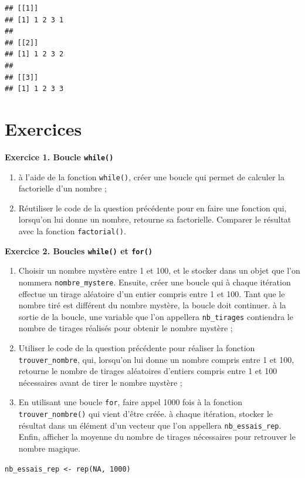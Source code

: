 \documentclass[
  11pt,
]{book}
\makeatletter
\providecommand{\tightlist}{%
  \setlength{\itemsep}{0pt}\setlength{\parskip}{0pt}}
\numberwithin{equation}{section}
\numberwithin{countremarque}{section}
\newcounter{exercices}[section]
\newenvironment{exframe}{%
 \def\at@end@of@exframe{}%
 \ifinner\ifhmode%
  \def\at@end@of@exframe{\end{minipage}}%
  \begin{minipage}{\columnwidth}%
 \fi\fi%
 \def\FrameCommand##1{\hskip\@totalleftmargin \hskip-\fboxsep
 \colorbox{shadecolorex}{##1}\hskip-\fboxsep
     \hskip-\linewidth \hskip-\@totalleftmargin \hskip\columnwidth}%
 \MakeFramed {\advance\hsize-\width
   \@totalleftmargin\z@ \linewidth\hsize
   \@setminipage}}%
 {\par\unskip\endMakeFramed%
 \at@end@of@exframe}
\makeatother
\begin{document}
\begin{lstlisting}
## [[1]]
## [1] 1 2 3 1
## 
## [[2]]
## [1] 1 2 3 2
## 
## [[3]]
## [1] 1 2 3 3
\end{lstlisting}

\hypertarget{boucles_exercices}{%
\section{Exercices}\label{boucles_exercices}}

\begin{exframe}
\textbf{Exercice 1. Boucle \texttt{while()}}

\begin{enumerate}
\def\labelenumi{\arabic{enumi}.}
\tightlist
\item
  à l'aide de la fonction \texttt{while()}, créer une boucle qui permet de calculer la factorielle d'un nombre ;
\item
  Réutiliser le code de la question précédente pour en faire une fonction qui, lorsqu'on lui donne un nombre, retourne sa factorielle. Comparer le résultat avec la fonction \texttt{factorial()}.
\end{enumerate}
\end{exframe}

\begin{exframe}
\textbf{Exercice 2. Boucles \texttt{while()} et \texttt{for()}}

\begin{enumerate}
\def\labelenumi{\arabic{enumi}.}
\tightlist
\item
  Choisir un nombre mystère entre 1 et 100, et le stocker dans un objet que l'on nommera \texttt{nombre\_mystere}. Ensuite, créer une boucle qui à chaque itération effectue un tirage aléatoire d'un entier compris entre 1 et 100. Tant que le nombre tiré est différent du nombre mystère, la boucle doit continuer. à la sortie de la boucle, une variable que l'on appellera \texttt{nb\_tirages} contiendra le nombre de tirages réalisés pour obtenir le nombre mystère ;
\item
  Utiliser le code de la question précédente pour réaliser la fonction \texttt{trouver\_nombre}, qui, lorsqu'on lui donne un nombre compris entre 1 et 100, retourne le nombre de tirages aléatoires d'entiers compris entre 1 et 100 nécessaires avant de tirer le nombre mystère ;
\item
  En utilisant une boucle \texttt{for}, faire appel 1000 fois à la fonction \texttt{trouver\_nombre()} qui vient d'être créée. à chaque itération, stocker le résultat dans un élément d'un vecteur que l'on appellera \texttt{nb\_essais\_rep}. Enfin, afficher la moyenne du nombre de tirages nécessaires pour retrouver le nombre magique.
\end{enumerate}

\texttt{nb\_essais\_rep\ \textless{}-\ rep(NA,\ 1000)}
\end{exframe}
\end{document}
